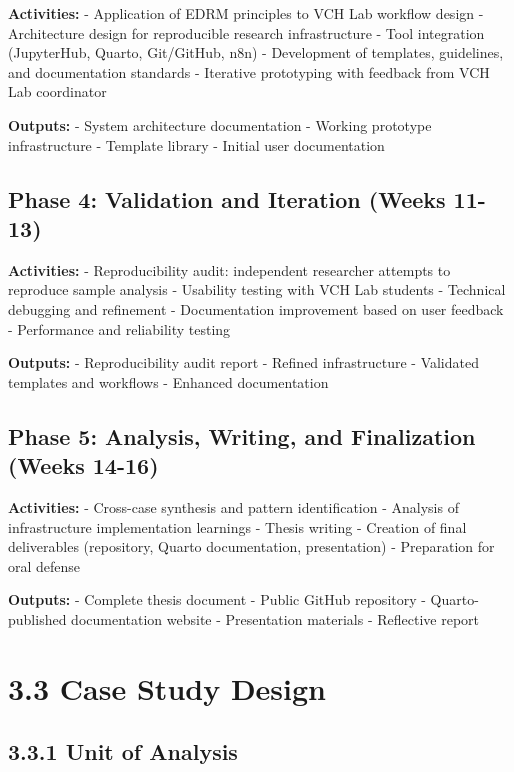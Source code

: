 \documentclass[
  oneside,
  open=any]{scrbook}
\begin{document}
\textbf{Activities:} - Application of EDRM principles to VCH Lab
workflow design - Architecture design for reproducible research
infrastructure - Tool integration (JupyterHub, Quarto, Git/GitHub, n8n)
- Development of templates, guidelines, and documentation standards -
Iterative prototyping with feedback from VCH Lab coordinator

\textbf{Outputs:} - System architecture documentation - Working
prototype infrastructure - Template library - Initial user documentation

\subsection{Phase 4: Validation and Iteration (Weeks
11-13)}\label{phase-4-validation-and-iteration-weeks-11-13}

\textbf{Activities:} - Reproducibility audit: independent researcher
attempts to reproduce sample analysis - Usability testing with VCH Lab
students - Technical debugging and refinement - Documentation
improvement based on user feedback - Performance and reliability testing

\textbf{Outputs:} - Reproducibility audit report - Refined
infrastructure - Validated templates and workflows - Enhanced
documentation

\subsection{Phase 5: Analysis, Writing, and Finalization (Weeks
14-16)}\label{phase-5-analysis-writing-and-finalization-weeks-14-16}

\textbf{Activities:} - Cross-case synthesis and pattern identification -
Analysis of infrastructure implementation learnings - Thesis writing -
Creation of final deliverables (repository, Quarto documentation,
presentation) - Preparation for oral defense

\textbf{Outputs:} - Complete thesis document - Public GitHub repository
- Quarto-published documentation website - Presentation materials -
Reflective report

\section{3.3 Case Study Design}\label{case-study-design}

\subsection{3.3.1 Unit of Analysis}\label{unit-of-analysis}
\end{document}
